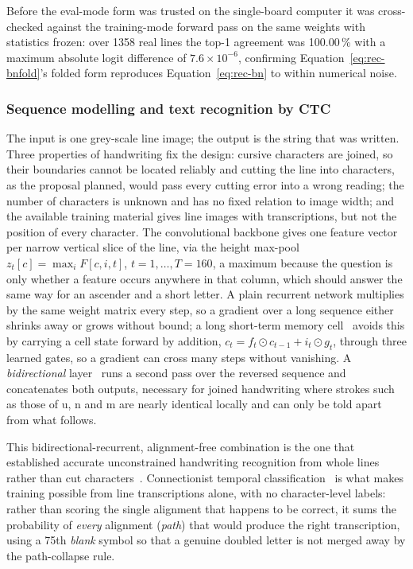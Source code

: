 Before the eval-mode form was trusted on the single-board computer it was cross-checked against the training-mode forward pass on the same weights with statistics frozen: over 1358 real lines the top-1 agreement was 100.00\,\% with a maximum absolute logit difference of $7.6\times10^{-6}$, confirming Equation~\ref{eq:rec-bnfold}'s folded form reproduces Equation~\ref{eq:rec-bn} to within numerical noise.

\subsubsection{Sequence modelling and text recognition by CTC}
\label{sec:rec-ctc}

The input is one grey-scale line image; the output is the string that was written. Three properties of handwriting fix the design: cursive characters are joined, so their boundaries cannot be located reliably and cutting the line into characters, as the proposal planned, would pass every cutting error into a wrong reading; the number of characters is unknown and has no fixed relation to image width; and the available training material gives line images with transcriptions, but not the position of every character. The convolutional backbone gives one feature vector per narrow vertical slice of the line, via the height max-pool $z_t[c]=\max_iF[c,i,t]$, $t=1,\ldots,T=160$, a maximum because the question is only whether a feature occurs anywhere in that column, which should answer the same way for an ascender and a short letter. A plain recurrent network multiplies by the same weight matrix every step, so a gradient over a long sequence either shrinks away or grows without bound; a long short-term memory cell~\cite{hochreiter1997} avoids this by carrying a cell state forward by addition, $c_t=f_t\odot c_{t-1}+i_t\odot g_t$, through three learned gates, so a gradient can cross many steps without vanishing. A \emph{bidirectional} layer~\cite{schuster1997} runs a second pass over the reversed sequence and concatenates both outputs, necessary for joined handwriting where strokes such as those of u, n and m are nearly identical locally and can only be told apart from what follows.

This bidirectional-recurrent, alignment-free combination is the one that established accurate unconstrained handwriting recognition from whole lines rather than cut characters~\cite[p.~855]{graves2009}. Connectionist temporal classification~\cite[p.~370]{graves2006} is what makes training possible from line transcriptions alone, with no character-level labels: rather than scoring the single alignment that happens to be correct, it sums the probability of \emph{every} alignment (\emph{path}) that would produce the right transcription, using a 75th \emph{blank} symbol so that a genuine doubled letter is not merged away by the path-collapse rule.


